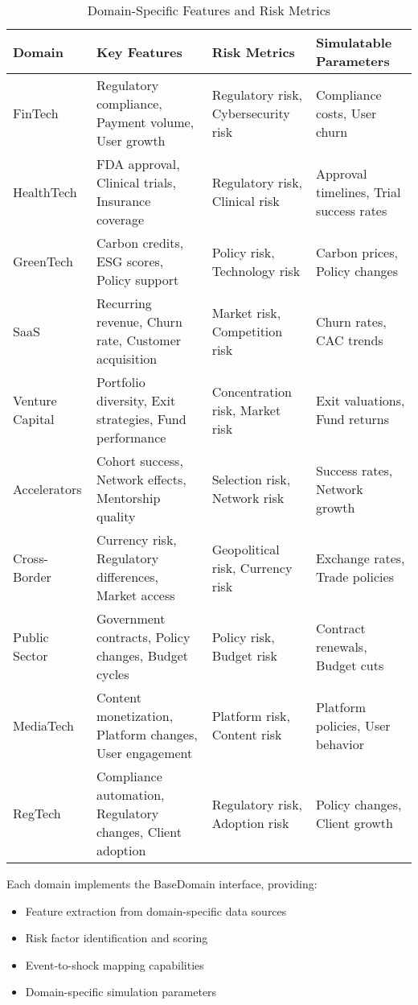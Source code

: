 \documentclass[conference]{IEEEtran}
\begin{document}
\begin{table}[H]
\centering
\caption{Domain-Specific Features and Risk Metrics}
\label{tab:domain_features}
\begin{tabular}{@{}llll@{}}
\toprule
\textbf{Domain} & \textbf{Key Features} & \textbf{Risk Metrics} & \textbf{Simulatable Parameters} \\
\midrule
FinTech & Regulatory compliance, Payment volume, User growth & Regulatory risk, Cybersecurity risk & Compliance costs, User churn \\
HealthTech & FDA approval, Clinical trials, Insurance coverage & Regulatory risk, Clinical risk & Approval timelines, Trial success rates \\
GreenTech & Carbon credits, ESG scores, Policy support & Policy risk, Technology risk & Carbon prices, Policy changes \\
SaaS & Recurring revenue, Churn rate, Customer acquisition & Market risk, Competition risk & Churn rates, CAC trends \\
Venture Capital & Portfolio diversity, Exit strategies, Fund performance & Concentration risk, Market risk & Exit valuations, Fund returns \\
Accelerators & Cohort success, Network effects, Mentorship quality & Selection risk, Network risk & Success rates, Network growth \\
Cross-Border & Currency risk, Regulatory differences, Market access & Geopolitical risk, Currency risk & Exchange rates, Trade policies \\
Public Sector & Government contracts, Policy changes, Budget cycles & Policy risk, Budget risk & Contract renewals, Budget cuts \\
MediaTech & Content monetization, Platform changes, User engagement & Platform risk, Content risk & Platform policies, User behavior \\
RegTech & Compliance automation, Regulatory changes, Client adoption & Regulatory risk, Adoption risk & Policy changes, Client growth \\
\bottomrule
\end{tabular}
\end{table}

Each domain implements the BaseDomain interface, providing:
\begin{itemize}
    \item Feature extraction from domain-specific data sources
    \item Risk factor identification and scoring
    \item Event-to-shock mapping capabilities
    \item Domain-specific simulation parameters
\end{itemize}
\end{document}
